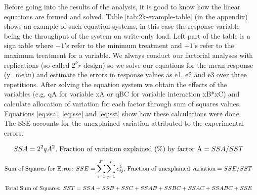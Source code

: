 \documentclass[11pt,a4paper]{article}
\begin{document}
\par Before going into the results of the analysis, it is good to know how the linear equations are formed and solved. Table \ref{tab:2k-example-table} (in the appendix) shows an example of such equation systems, in this case the response variable being the throughput of the system on write-only load. Left part of the table is a sign table where $-1$'s refer to the minimum treatment and $+1$'s refer to the maximum treatment for a variable. We always conduct our factorial analyses with replications (so-called $2^{k}r$ design) so we solve our equations for the mean response (y\_mean) and estimate the errors in response values as e1, e2 and e3 over three repetitions. After solving the equation system we obtain the effects of the variables (e.g. qA for variable xA or qBC for variable interaction xB*xC) and calculate allocation of variation for each factor through sum of squares values. Equations \ref{eq:ssa}, \ref{eq:sse} and \ref{eq:sst} show how these calculations were done. The SSE accounts for the unexplained variation attributed to the experimental errors.
\begin{small}
\begin{equation} \label{eq:ssa}
SSA = 2^2 qA^2 \textnormal{, Fraction of variation explained (\%) by factor A} = SSA / SST
\end{equation}
\begin{equation} \label{eq:sse}
\textnormal{Sum of Squares for Error: } SSE = \sum_{i=1}^{2^{k}}\sum_{j=1}^{r} e_{ij}^{2} \textnormal{, Fraction of unexplained variation} = SSE / SST
\end{equation}
\begin{equation} \label{eq:sst}
\textnormal{Total Sum of Squares: } SST = SSA + SSB + SSC + SSAB + SSBC + SSAC + SSABC + SSE
\end{equation}
\end{small}
\end{document}

